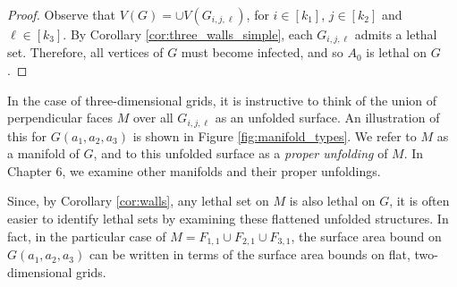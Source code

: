 \begin{proof}
Observe that $V(G) = \cup V(G_{i,j,\ell})$, for $i \in [k_1]$, $j \in [k_2]$ and $\ell \in [k_3]$. By Corollary \ref{cor:three_walls_simple}, each $G_{i,j,\ell}$ admits a lethal set. Therefore, all vertices of $G$ must become infected, and so $A_0$ is lethal on $G$.
\end{proof}

In the case of three-dimensional grids, it is instructive to think of the union of perpendicular faces $M$ over all $G_{i,j,\ell}$ as an unfolded surface. An illustration of this for $G(a_1,a_2,a_3)$ is shown in Figure \ref{fig:manifold_types}. We refer to $M$ as a manifold of $G$, and to this unfolded surface as a \emph{proper unfolding} of $M$. In Chapter 6, we examine other manifolds and their proper unfoldings. 

Since, by Corollary \ref{cor:walls}, any lethal set on $M$ is also lethal on $G$, it is often easier to identify lethal sets by examining these flattened unfolded structures. In fact, in the particular case of $M = F_{1,1} \cup F_{2,1} \cup F_{3,1}$, the surface area bound on $G(a_1,a_2,a_3)$ can be written in terms of the surface area bounds on flat, two-dimensional grids.

